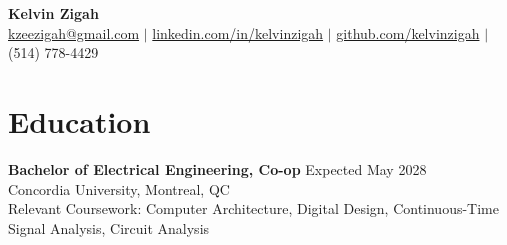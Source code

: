 \documentclass[10pt]{article}
\begin{document}
\begin{center}
    {\LARGE\bfseries Kelvin Zigah} \\[0.15cm]
    \href{mailto:kzeezigah@gmail.com}{kzeezigah@gmail.com} $\mid$
    \href{https://www.linkedin.com/in/kelvinzigah/}{linkedin.com/in/kelvinzigah} $\mid$
    \href{https://github.com/kelvinzigah}{github.com/kelvinzigah} $\mid$
    (514) 778-4429
\end{center}

\section*{Education}
\textbf{Bachelor of Electrical Engineering, Co-op} \hfill Expected May 2028 \\
Concordia University, Montreal, QC \\
Relevant Coursework: Computer Architecture, Digital Design, Continuous-Time Signal Analysis, Circuit Analysis

\end{document}
